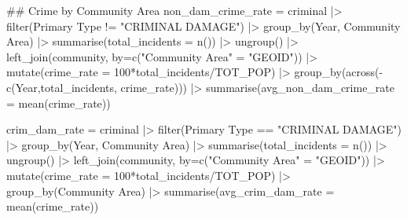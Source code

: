 \documentclass[
]{report}
\newenvironment{Shaded}{}{}
\newcommand{\AttributeTok}[1]{\textcolor[rgb]{0.65,0.15,0.64}{#1}}
\newcommand{\DecValTok}[1]{\textcolor[rgb]{0.60,0.41,0.00}{#1}}
\newcommand{\DocumentationTok}[1]{\textcolor[rgb]{0.89,0.34,0.29}{#1}}
\newcommand{\FunctionTok}[1]{\textcolor[rgb]{0.25,0.47,0.95}{#1}}
\newcommand{\NormalTok}[1]{\textcolor[rgb]{0.22,0.23,0.26}{#1}}
\newcommand{\OtherTok}[1]{\textcolor[rgb]{0.15,0.68,0.38}{#1}}
\newcommand{\SpecialCharTok}[1]{\textcolor[rgb]{0.00,0.52,0.74}{#1}}
\newcommand{\StringTok}[1]{\textcolor[rgb]{0.31,0.63,0.31}{#1}}
\begin{document}
\begin{Shaded}
\begin{Highlighting}[]
\DocumentationTok{\#\# Crime by Community Area}
\NormalTok{non\_dam\_crime\_rate }\OtherTok{=}\NormalTok{ criminal }\SpecialCharTok{|\textgreater{}} 
  \FunctionTok{filter}\NormalTok{(}\StringTok{\textasciigrave{}}\AttributeTok{Primary Type}\StringTok{\textasciigrave{}} \SpecialCharTok{!=} \StringTok{"CRIMINAL DAMAGE"}\NormalTok{) }\SpecialCharTok{|\textgreater{}} 
  \FunctionTok{group\_by}\NormalTok{(Year, }\StringTok{\textasciigrave{}}\AttributeTok{Community Area}\StringTok{\textasciigrave{}}\NormalTok{) }\SpecialCharTok{|\textgreater{}} 
  \FunctionTok{summarise}\NormalTok{(}\AttributeTok{total\_incidents =} \FunctionTok{n}\NormalTok{()) }\SpecialCharTok{|\textgreater{}} 
  \FunctionTok{ungroup}\NormalTok{() }\SpecialCharTok{|\textgreater{}} 
  \FunctionTok{left\_join}\NormalTok{(community, }\AttributeTok{by=}\FunctionTok{c}\NormalTok{(}\StringTok{"Community Area"} \OtherTok{=} \StringTok{"GEOID"}\NormalTok{)) }\SpecialCharTok{|\textgreater{}} 
  \FunctionTok{mutate}\NormalTok{(}\AttributeTok{crime\_rate =} \DecValTok{100}\SpecialCharTok{*}\NormalTok{total\_incidents}\SpecialCharTok{/}\NormalTok{TOT\_POP) }\SpecialCharTok{|\textgreater{}} 
  \FunctionTok{group\_by}\NormalTok{(}\FunctionTok{across}\NormalTok{(}\SpecialCharTok{{-}}\FunctionTok{c}\NormalTok{(Year,total\_incidents, crime\_rate))) }\SpecialCharTok{|\textgreater{}} 
  \FunctionTok{summarise}\NormalTok{(}\AttributeTok{avg\_non\_dam\_crime\_rate =} \FunctionTok{mean}\NormalTok{(crime\_rate))}

\NormalTok{crim\_dam\_rate }\OtherTok{=}\NormalTok{ criminal }\SpecialCharTok{|\textgreater{}} 
  \FunctionTok{filter}\NormalTok{(}\StringTok{\textasciigrave{}}\AttributeTok{Primary Type}\StringTok{\textasciigrave{}} \SpecialCharTok{==} \StringTok{"CRIMINAL DAMAGE"}\NormalTok{) }\SpecialCharTok{|\textgreater{}} 
  \FunctionTok{group\_by}\NormalTok{(Year, }\StringTok{\textasciigrave{}}\AttributeTok{Community Area}\StringTok{\textasciigrave{}}\NormalTok{) }\SpecialCharTok{|\textgreater{}} 
  \FunctionTok{summarise}\NormalTok{(}\AttributeTok{total\_incidents =} \FunctionTok{n}\NormalTok{()) }\SpecialCharTok{|\textgreater{}} 
  \FunctionTok{ungroup}\NormalTok{() }\SpecialCharTok{|\textgreater{}} 
  \FunctionTok{left\_join}\NormalTok{(community, }\AttributeTok{by=}\FunctionTok{c}\NormalTok{(}\StringTok{"Community Area"} \OtherTok{=} \StringTok{"GEOID"}\NormalTok{)) }\SpecialCharTok{|\textgreater{}} 
  \FunctionTok{mutate}\NormalTok{(}\AttributeTok{crime\_rate =} \DecValTok{100}\SpecialCharTok{*}\NormalTok{total\_incidents}\SpecialCharTok{/}\NormalTok{TOT\_POP) }\SpecialCharTok{|\textgreater{}} 
  \FunctionTok{group\_by}\NormalTok{(}\StringTok{\textasciigrave{}}\AttributeTok{Community Area}\StringTok{\textasciigrave{}}\NormalTok{) }\SpecialCharTok{|\textgreater{}} 
  \FunctionTok{summarise}\NormalTok{(}\AttributeTok{avg\_crim\_dam\_rate =} \FunctionTok{mean}\NormalTok{(crime\_rate))}
  

\end{Highlighting}
\end{Shaded}
\end{document}
